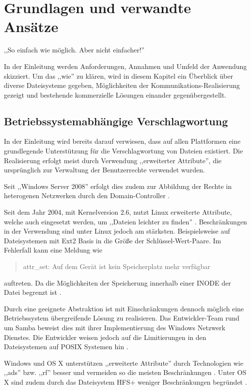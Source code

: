 \documentclass[oneside, ngerman, toc=bibliography,bibliography=totoc,listof=entryprefix, open=right,numbers=noenddot,fontsize=12pt]{scrbook}
\newcommand\chapmd[2]{\begin{mdframed}[%
		rightline=false,leftline=false,topline=false,bottomline=false,frametitlerule=false,
		userdefinedwidth=\textwidth,frametitlealignment=\flushright, %
		frametitlerulecolor=black,frametitle={\small #1}]
		\flushright{} \footnotesize{} #2
	\end{mdframed}}
\begin{document}
\chapter{Grundlagen und verwandte Ansätze}
\chapmd{Albert Einstein (1879--1955)}{,,So einfach wie möglich. Aber nicht einfacher!''}

In der Einleitung werden Anforderungen, Annahmen und Umfeld der Anwendung skizziert.
Um das ,,wie'' zu klären, wird in diesem Kapitel ein Überblick über diverse Dateisysteme gegeben, Möglichkeiten der Kommunikations-Realisierung gezeigt und bestehende kommerzielle Lösungen einander gegenübergestellt.

\section{Betriebssystemabhängige Verschlagwortung}
In der Einleitung wird bereits darauf verwiesen, dass auf allen Plattformen eine grundlegende Unterstützung für die Verschlagwortung von Dateien existiert. Die Realisierung erfolgt meist durch Verwendung ,,erweiterter Attribute'', die ursprünglich zur Verwaltung der Benutzerrechte verwendet wurden. 

Seit ,,Windows Server 2008'' erfolgt dies zudem zur Abbildung der Rechte in heterogenen Netzwerken durch den Domain-Controller  \cite{windowsserver2008}.

Seit dem Jahr 2004, mit Kernelversion 2.6, nutzt Linux erweiterte Attribute, welche auch eingesetzt werden, um ,,Dateien leichter zu finden''  \cite{von2006100}. Beschränkungen in der Verwendung sind unter Linux jedoch am stärksten. Beispielsweise auf Dateisystemen mit Ext2 Basis in die Größe der Schlüssel-Wert-Paare. Im Fehlerfall kann eine Meldung wie

\begin{quote}
attr\_set: Auf dem Gerät ist kein Speicherplatz mehr verfügbar
\end{quote}

auftreten. Da die Möglichkeiten der Speicherung innerhalb einer INODE der Datei begrenzt ist \cite{kernelwiki}.

Durch eine geeignete Abstraktion ist mit Einschränkungen dennoch möglich eine Betriebssystem übergreifende Lösung zu realisieren. Das Entwickler-Team rund um Samba beweist dies mit ihrer Implementierung des Windows Netzwerk Dienstes. Die Entwickler weisen jedoch auf die Limitierungen in den Dateisystemen auf POSIX Systemen hin  \cite{smb}.

Windows und OS X unterstützen ,,erweiterte Attribute'' durch Technologien wie ,,\acrfull{ads}'' bzw.  ,,\acrfull{rf}'' besser und vermeiden so die meisten Beschränkungen \cite{surendorf2010mac}. Unter OS X sind zudem durch das Dateisystem HFS+ weniger Beschränkungen begründet \cite{macdsa}.
\end{document}
